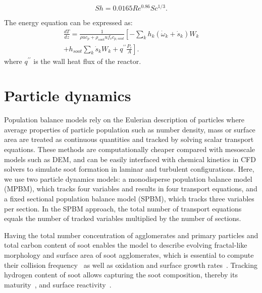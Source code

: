 \begin{equation}
	Sh=
	0.0165Re^{0.86} Sc^{1/3}
	\label{eqn:shdep}.
\end{equation}

The energy equation can be expressed as:
\begin{equation}
	\begin{split}
		\frac{d T}{d z}=
		\frac{1}{\rho u c_p+\rho_{soot} u f_v 	c_{p,soot}}
		\left[
			-\sum_k h_k
			\left(
			\dot{\omega}_k+\dot{s}_k
			\right) W_k
		\right. \\
		\left.
			+h_{soot}\sum_k \dot{s}_k W_k
			+q^{\prime \prime}\frac{P_c}{A}
		\right].
	\end{split}
	\label{eqn:energypfr}
\end{equation}
\noindent where $q^{\prime \prime}$ is the wall heat flux of the reactor.



\section{Particle dynamics}
\label{sec:particledynamics}
Population balance models rely on the Eulerian description of particles where average properties of particle population such as number density, mass or surface area are treated as continuous quantities and tracked by solving scalar transport equations. These methods are computationally cheaper compared with mesoscale models such as DEM, and can be easily interfaced with chemical kinetics in CFD solvers to simulate soot formation in laminar and turbulent configurations. Here, we use two particle dynamics models: a monodisperse population balance model (MPBM), which tracks four variables and results in four transport equations, and a fixed sectional population balance model (SPBM), which tracks three variables per section. In the SPBM approach, the total number of transport equations equals the number of tracked variables multiplied by the number of sections. 

Having the total number concentration of agglomerates and primary particles and total carbon content of soot enables the model to describe evolving fractal-like morphology and surface area of soot agglomerates, which is essential to compute their collision frequency~\citep{mulholland1988cluster} as well as oxidation and surface growth rates~\citep{kelesidis2019estimating}. Tracking hydrogen content of soot allows capturing the soot composition, thereby its maturity~\citep{kholghy2016core}, and surface reactivity~\citep{blanquart2009analyzing}.

